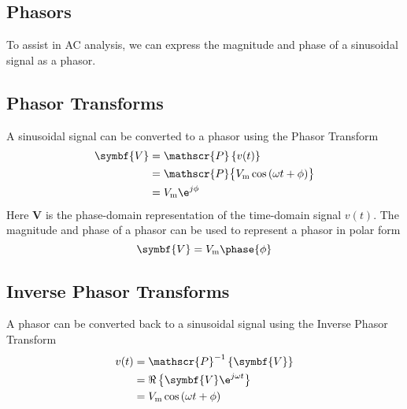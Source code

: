 \documentclass{article}
\begin{document}
\subsection{Phasors}
\begin{definition}
    To assist in AC analysis, we can express the magnitude and phase of a sinusoidal signal
    as a phasor.
\end{definition}
\subsection{Phasor Transforms}
\begin{definition}
    A sinusoidal signal can be converted to a phasor using the Phasor Transform
    \begin{align*}
        \symbf{V} & = \mathscr{P}\left\{ v(t) \right\}                                              \\
                  & = \mathscr{P}\bigl\{ V_{\mathrm{m}}\cos{\left( \omega t + \phi \right)} \bigr\} \\
                  & = V_{\mathrm{m}} \e^{j\phi}
    \end{align*}
    Here $\symbf{V}$ is the phase-domain representation of the
    time-domain signal $v(t)$.
    The magnitude and phase of a phasor can be used to represent a phasor in polar form
    \begin{equation*}
        \symbf{V} = V_{\mathrm{m}} \phase{\phi}
    \end{equation*}
\end{definition}
\subsection{Inverse Phasor Transforms}
\begin{definition}
    A phasor can be converted back to a sinusoidal signal using the Inverse Phasor Transform
    \begin{align*}
        v(t) & = \mathscr{P}^{-1}\left\{ \symbf{V} \right\}         \\
             & = \Re\left\{ \symbf{V} \e^{j\omega t} \right\}       \\
             & = V_{\mathrm{m}}\cos{\left( \omega t + \phi \right)}
    \end{align*}
\end{definition}
\end{document}
